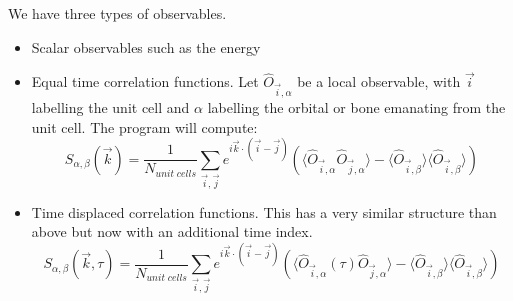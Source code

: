 We have three types of observables. 
\begin{itemize}
\item Scalar observables such as the energy
\item Equal time correlation functions.  Let $\hat{O}_{\vec{i},\alpha} $ be a local observable,  with $\vec{i}$ labelling the unit cell and $\alpha$ labelling the orbital or bone emanating 
from the unit cell.   The program will compute: 
\begin{equation}
	S_{\alpha,\beta}(\vec{k}) = \frac{1}{N_{unit \;  cells}} \sum_{\vec{i},\vec{j}} e^{i \vec{k}\cdot (\vec{i} -  \vec{j} ) } \left( \langle \hat{O}_{\vec{i},\alpha}  \hat{O}_{\vec{j},\alpha} \rangle  - 
	  \langle \hat{O}_{\vec{i},\beta} \rangle \langle   \hat{O}_{\vec{i},\beta}  \rangle \right) 
\end{equation}
\item  Time displaced correlation functions. This has a very similar structure than above but now with an additional time index.
\begin{equation}
	S_{\alpha,\beta}(\vec{k},\tau) = \frac{1}{N_{unit \;  cells}} \sum_{\vec{i},\vec{j}} e^{i \vec{k}\cdot (\vec{i} -  \vec{j} ) } \left( \langle \hat{O}_{\vec{i},\alpha} (\tau) \hat{O}_{\vec{j},\alpha} \rangle  - 
	  \langle \hat{O}_{\vec{i},\beta} \rangle \langle   \hat{O}_{\vec{i},\beta}  \rangle \right) 
\end{equation}
\end{itemize}










